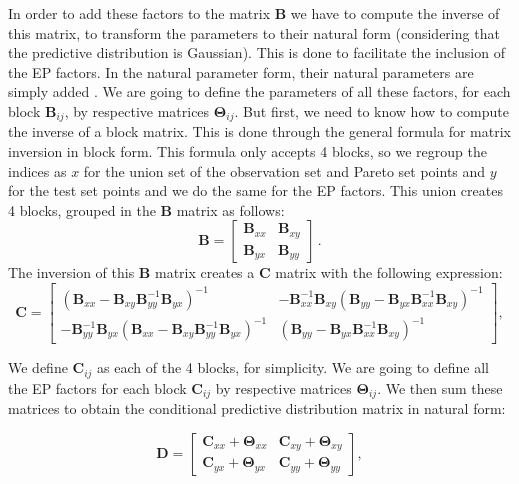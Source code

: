 In order to add these factors to the matrix $\mathbf{B}$ we have to compute the inverse of this matrix, to transform the parameters to their natural form (considering that the predictive distribution is Gaussian). This is done to facilitate the inclusion of the EP factors. In the natural parameter form, their natural parameters are simply added \cite{matthias2006}. We are going to define the parameters of all these factors, for each block $\mathbf{B}_{ij}$, by respective matrices $\mathbf{\Theta}_{ij}$. But first, we need to know how to compute the inverse of a block matrix. This is done through the general formula for matrix inversion in block form. This formula only accepts 4 blocks, so we regroup the indices as $x$ for the union set of the observation set and Pareto set points and $y$ for the test set points and we do the same for the EP factors. This union creates 4 blocks, grouped in the $\mathbf{B}$ matrix as follows:
\[
\mathbf{B}=
\left[
\begin{array}{c|c}
\mathbf{B}_{xx} & \mathbf{B}_{xy}\\
\hline
\mathbf{B}_{yx} & \mathbf{B}_{yy}
\end{array}
\right]\,.
\]
The inversion of this $\mathbf{B}$ matrix creates a $\mathbf{C}$ matrix with the following expression:
\[
\mathbf{C}=
\left[
\begin{array}{c|c}
(\mathbf{B}_{xx}-\mathbf{B}_{xy}\mathbf{B}_{yy}^{-1}\mathbf{B}_{yx})^{-1} & -\mathbf{B}_{xx}^{-1}\mathbf{B}_{xy}(\mathbf{B}_{yy}-\mathbf{B}_{yx}\mathbf{B}_{xx}^{-1}\mathbf{B}_{xy})^{-1}\\
\hline
-\mathbf{B}_{yy}^{-1}\mathbf{B}_{yx}(\mathbf{B}_{xx}-\mathbf{B}_{xy}\mathbf{B}_{yy}^{-1}\mathbf{B}_{yx})^{-1} & (\mathbf{B}_{yy}-\mathbf{B}_{yx}\mathbf{B}_{xx}^{-1}\mathbf{B}_{xy})^{-1}
\end{array}
\right],
\]

We define $\mathbf{C}_{ij}$ as each of the 4 blocks, for simplicity. We are going to define all the EP factors for each block $\mathbf{C}_{ij}$ by respective matrices $\mathbf{\Theta}_{ij}$. We then sum these matrices to obtain the conditional predictive distribution matrix in natural form:

\[
\mathbf{D}=
\left[
\begin{array}{c|c}
\mathbf{C}_{xx} + \mathbf{\Theta}_{xx} & \mathbf{C}_{xy} + \mathbf{\Theta}_{xy}\\
\hline
\mathbf{C}_{yx} + \mathbf{\Theta}_{yx} & \mathbf{C}_{yy} + \mathbf{\Theta}_{yy}
\end{array}
\right],
\]

